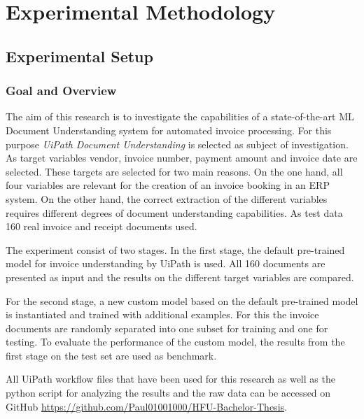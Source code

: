 \chapter{Experimental Methodology}

\section{Experimental Setup}
\subsection{Goal and Overview}
The aim of this research is to investigate the capabilities of a state-of-the-art \acl{ML} Document Understanding system for automated invoice processing. For this purpose \textit{UiPath Document Understanding} is selected as subject of investigation. As target variables vendor, invoice number, payment amount and invoice date are selected. These targets are selected for two main reasons. On the one hand, all four variables are relevant for the creation of an invoice booking in an ERP system. On the other hand, the correct extraction of the different variables requires different degrees of document understanding capabilities. As test data 160 real invoice and receipt documents used.

The experiment consist of two stages. In the first stage, the default pre-trained model for invoice understanding by UiPath is used. All 160 documents are presented as input and the results on the different target variables are compared. 

For the second stage, a new custom model based on the default pre-trained model is instantiated and trained with additional examples. For this the invoice documents are randomly separated into one subset for training and one for testing. To evaluate the performance of the custom model, the results from the first stage on the test set are used as benchmark. 

All UiPath workflow files that have been used for this research as well as the python script for analyzing the results and the raw data can be accessed on GitHub \url{https://github.com/Paul01001000/HFU-Bachelor-Thesis}.

